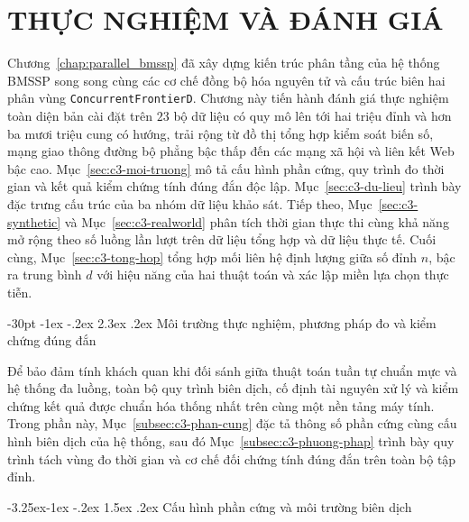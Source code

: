 \documentclass[12pt,a4paper,openany,oneside]{report}
\makeatletter
\theoremstyle{plain}
\renewcommand\section{\@startsection {section}{1}{\z@}
    {-30pt \@plus -1ex \@minus -.2ex}
    {2.3ex \@plus.2ex}
    {\normalfont\large\bfseries}}
\renewcommand\subsection{\@startsection{subsection}{2}{\z@}
    {-3.25ex\@plus -1ex \@minus -.2ex}
    {1.5ex \@plus .2ex}
    {\normalfont\normalsize\bfseries}}
\numberwithin{equation}{section}
\makeatother
\begin{document}
\chapter{THỰC NGHIỆM VÀ ĐÁNH GIÁ}
\label{ch:thuc-nghiem}
\hypersetup{linkcolor=black, citecolor=black, urlcolor=black}

Chương~\ref{chap:parallel_bmssp} đã xây dựng kiến trúc phân tầng của hệ thống BMSSP song song cùng các cơ chế đồng bộ hóa nguyên tử và cấu trúc biên hai phân vùng \texttt{Concurrent\allowbreak FrontierD}. Chương này tiến hành đánh giá thực nghiệm toàn diện bản cài đặt trên $23$ bộ dữ liệu có quy mô lên tới hai triệu đỉnh và hơn ba mươi triệu cung có hướng, trải rộng từ đồ thị tổng hợp kiểm soát biến số, mạng giao thông đường bộ phẳng bậc thấp đến các mạng xã hội và liên kết Web bậc cao. Mục~\ref{sec:c3-moi-truong} mô tả cấu hình phần cứng, quy trình đo thời gian và kết quả kiểm chứng tính đúng đắn độc lập. Mục~\ref{sec:c3-du-lieu} trình bày đặc trưng cấu trúc của ba nhóm dữ liệu khảo sát. Tiếp theo, Mục~\ref{sec:c3-synthetic} và Mục~\ref{sec:c3-realworld} phân tích thời gian thực thi cùng khả năng mở rộng theo số luồng lần lượt trên dữ liệu tổng hợp và dữ liệu thực tế. Cuối cùng, Mục~\ref{sec:c3-tong-hop} tổng hợp mối liên hệ định lượng giữa số đỉnh $n$, bậc ra trung bình $d$ với hiệu năng của hai thuật toán và xác lập miền lựa chọn thực tiễn.

\section{Môi trường thực nghiệm, phương pháp đo và kiểm chứng đúng đắn}\label{sec:c3-moi-truong}

Để bảo đảm tính khách quan khi đối sánh giữa thuật toán tuần tự chuẩn mực và hệ thống đa luồng, toàn bộ quy trình biên dịch, cố định tài nguyên xử lý và kiểm chứng kết quả được chuẩn hóa thống nhất trên cùng một nền tảng máy tính. Trong phần này, Mục~\ref{subsec:c3-phan-cung} đặc tả thông số phần cứng cùng cấu hình biên dịch của hệ thống, sau đó Mục~\ref{subsec:c3-phuong-phap} trình bày quy trình tách vùng đo thời gian và cơ chế đối chứng tính đúng đắn trên toàn bộ tập đỉnh.

\subsection{Cấu hình phần cứng và môi trường biên dịch}\label{subsec:c3-phan-cung}
\end{document}
